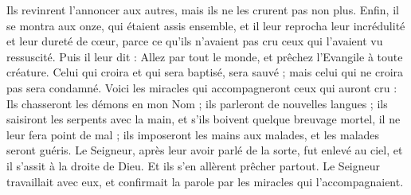 \begin{multicols}{2}
Ils revinrent l’annoncer aux autres, mais ils ne les crurent pas non plus.
Enfin, il se montra aux onze, qui étaient assis ensemble, et il leur reprocha leur incrédulité et leur dureté de cœur, parce ce qu'ils n'avaient pas cru ceux qui l'avaient vu ressuscité.
Puis il leur dit : Allez par tout le monde, et prêchez l'Evangile à toute créature.
Celui qui croira et qui sera baptisé, sera sauvé ; mais celui qui ne croira pas sera condamné.
Voici les miracles qui accompagneront ceux qui auront cru : Ils chasseront les démons en mon Nom ; ils parleront de nouvelles langues ;
ils saisiront les serpents avec la main, et s’ils boivent quelque breuvage mortel, il ne leur fera point de mal ; ils imposeront les mains aux malades, et les malades seront guéris.
Le Seigneur, après leur avoir parlé de la sorte, fut enlevé au ciel, et il s'assit à la droite de Dieu.
Et ils s’en allèrent prêcher partout. Le Seigneur travaillait avec eux, et confirmait la parole par les miracles qui l'accompagnaient.
\PPE{}
\end{multicols}
